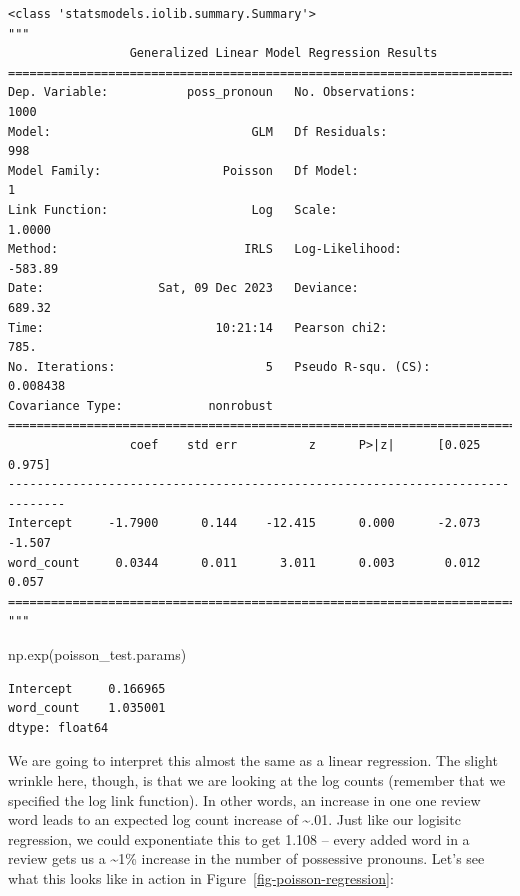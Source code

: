 \documentclass[
  letterpaper,
]{krantz}
\newenvironment{Shaded}{}{}
\newcommand{\NormalTok}[1]{#1}
\begin{document}
\begin{verbatim}
<class 'statsmodels.iolib.summary.Summary'>
"""
                 Generalized Linear Model Regression Results                  
==============================================================================
Dep. Variable:           poss_pronoun   No. Observations:                 1000
Model:                            GLM   Df Residuals:                      998
Model Family:                 Poisson   Df Model:                            1
Link Function:                    Log   Scale:                          1.0000
Method:                          IRLS   Log-Likelihood:                -583.89
Date:                Sat, 09 Dec 2023   Deviance:                       689.32
Time:                        10:21:14   Pearson chi2:                     785.
No. Iterations:                     5   Pseudo R-squ. (CS):           0.008438
Covariance Type:            nonrobust                                         
==============================================================================
                 coef    std err          z      P>|z|      [0.025      0.975]
------------------------------------------------------------------------------
Intercept     -1.7900      0.144    -12.415      0.000      -2.073      -1.507
word_count     0.0344      0.011      3.011      0.003       0.012       0.057
==============================================================================
"""
\end{verbatim}

\begin{Shaded}
\begin{Highlighting}[]
\NormalTok{np.exp(poisson\_test.params)}
\end{Highlighting}
\end{Shaded}

\begin{verbatim}
Intercept     0.166965
word_count    1.035001
dtype: float64
\end{verbatim}

We are going to interpret this almost the same as a linear regression.
The slight wrinkle here, though, is that we are looking at the log
counts (remember that we specified the log link function). In other
words, an increase in one one review word leads to an expected log count
increase of \textasciitilde.01. Just like our logisitc regression, we
could exponentiate this to get 1.108 -- every added word in a review
gets us a \textasciitilde1\% increase in the number of possessive
pronouns. Let's see what this looks like in action in
Figure~\ref{fig-poisson-regression}:
\end{document}
